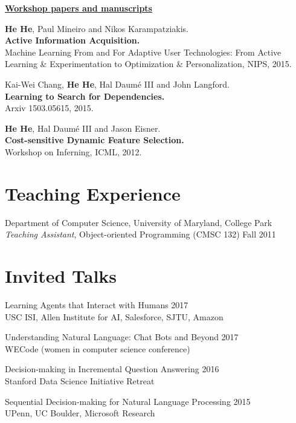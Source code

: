 \documentclass[margin,line]{resume}
\begin{document}
\begin{resume}
{\bf\underline{Workshop papers and manuscripts}}

{\bf He He}, Paul Mineiro and Nikos Karampatziakis. \\
{\bf Active Information Acquisition.}\\
Machine Learning From and For Adaptive User Technologies: From Active Learning \& Experimentation to Optimization \& Personalization, NIPS, 2015.%

Kai-Wei Chang, {\bf He He}, Hal Daum\'e III and John Langford.\\
{\bf Learning to Search for Dependencies.}\\
Arxiv 1503.05615, 2015.

{\bf He He}, Hal Daum\'e III and Jason Eisner.\\
{\bf Cost-sensitive Dynamic Feature Selection.}\\
Workshop on Inferning, ICML, 2012.

\section{\sc Teaching Experience} 
Department of Computer Science, University of Maryland, College Park\\
\emph{Teaching Assistant}, Object-oriented Programming (CMSC 132) \hfill Fall 2011
  

\section{\sc Invited Talks}
Learning Agents that Interact with Humans \hfill 2017\\
USC ISI, Allen Institute for AI, Salesforce, SJTU, Amazon

Understanding Natural Language: Chat Bots and Beyond \hfill 2017\\
WECode (women in computer science conference)

Decision-making in Incremental Question Answering \hfill 2016\\
Stanford Data Science Initiative Retreat

Sequential Decision-making for Natural Language Processing \hfill 2015\\
UPenn, UC Boulder, Microsoft Research


\end{resume}
\end{document}
